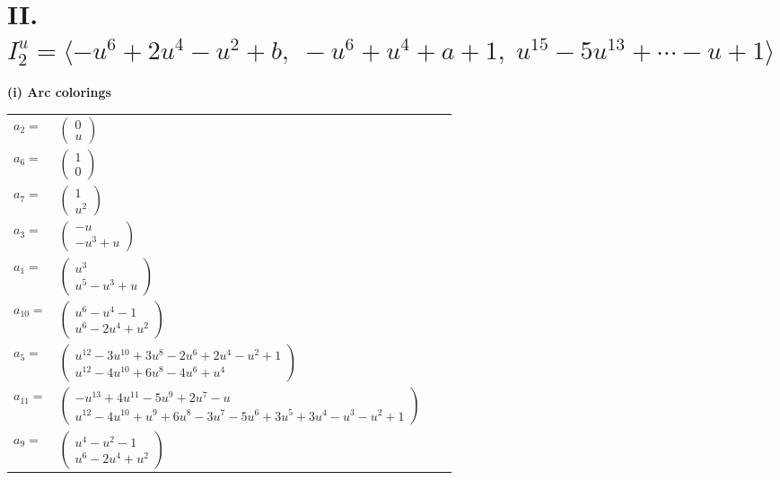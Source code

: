 \documentclass[1p]{elsarticle_modified}
\theoremstyle{definition}
\begin{document}
\centering \section*{II. $I^u_{2}= \langle - u^6+2 u^4- u^2+b,\;- u^6+u^4+a+1,\;u^{15}-5 u^{13}+\cdots- u+1 \rangle$}
\flushleft \textbf{(i) Arc colorings}\\
\begin{tabular}{m{7pt} m{180pt} m{7pt} m{180pt} }
\flushright $a_{2}=$&$\begin{pmatrix}0\\u\end{pmatrix}$ \\
\flushright $a_{6}=$&$\begin{pmatrix}1\\0\end{pmatrix}$ \\
\flushright $a_{7}=$&$\begin{pmatrix}1\\u^2\end{pmatrix}$ \\
\flushright $a_{3}=$&$\begin{pmatrix}- u\\- u^3+u\end{pmatrix}$ \\
\flushright $a_{1}=$&$\begin{pmatrix}u^3\\u^5- u^3+u\end{pmatrix}$ \\
\flushright $a_{10}=$&$\begin{pmatrix}u^6- u^4-1\\u^6-2 u^4+u^2\end{pmatrix}$ \\
\flushright $a_{5}=$&$\begin{pmatrix}u^{12}-3 u^{10}+3 u^8-2 u^6+2 u^4- u^2+1\\u^{12}-4 u^{10}+6 u^8-4 u^6+u^4\end{pmatrix}$ \\
\flushright $a_{11}=$&$\begin{pmatrix}- u^{13}+4 u^{11}-5 u^9+2 u^7- u\\u^{12}-4 u^{10}+u^9+6 u^8-3 u^7-5 u^6+3 u^5+3 u^4- u^3- u^2+1\end{pmatrix}$ \\
\flushright $a_{9}=$&$\begin{pmatrix}u^4- u^2-1\\u^6-2 u^4+u^2\end{pmatrix}$ \\

\end{tabular}
\end{document}
